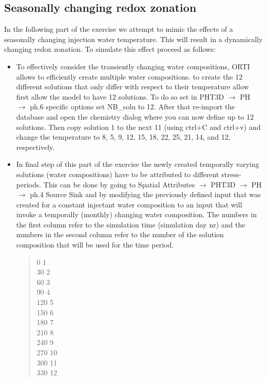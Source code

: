 \subsection[Seasonally changing redox zonation]{Seasonally changing redox zonation}

In the following part of the exercise we attempt to mimic the effects of a 
seasonally changing injection water temperature. 
This will result in a dynamically changing redox zonation.
To simulate this effect proceed as follows:

\begin{itemize}

\item To effectively consider the transiently changing water compositions, 
ORTI allows to efficiently create multiple water compositions.
to create the 12 different solutions that only differ with respect 
to their temperature allow first allow the model to have 12 solutions. 
To do so set in {\color{blue}PHT3D} $\rightarrow$ {\color{blue}PH} 
$\rightarrow$ {\color{blue}ph.6 specific options}
set {\color{red}NB\_solu} to 12. After that re-import the database and open the 
chemistry dialog where you can now define up to 12 solutions. 
Then copy solution 1 to the next 11 (using ctrl+C and ctrl+v) and change the 
temperature to 8, 5, 9, 12, 15, 18, 22, 25, 21, 14, and 12, respectively. 

\item In final step of this part of the exercise the newly created temporally varying 
solutions (water compositions) have to be attributed to different stress-periods.
This can be done by going to {\color{blue}Spatial Attributes} 
$\rightarrow$ {\color{blue}PHT3D} $\rightarrow$ {\color{blue}PH} 
$\rightarrow$ {\color{blue}ph.4 Source \/ Sink} and 
by modifying the previously defined 
input that was created for a constant injectant water composition to an 
input that will invoke a temporally (monthly) changing water composition.
The numbers in the first column refer to the simulation time (simulation day nr) 
and the numbers in the second column refer to the number of the 
solution composition that will be used for the time period. 

{\color{red}
\begin{quote}
0	1 \\
30	2 \\
60	3 \\
90	4 \\
120	5 \\
150	6 \\
180	7 \\
210	8 \\
240	9 \\
270	10 \\
300	11 \\
330	12 \\
\end{quote}}


\end{itemize}
